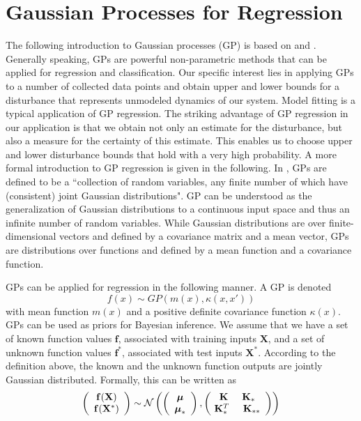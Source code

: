\documentclass[../main.tex]{subfiles}
\begin{document}
\section{Gaussian Processes for Regression}\label{sec:GP}
The following introduction to Gaussian processes (GP) is based on \cite{murphy2012machine} and \cite{rasmussen2006gaussian}. Generally speaking, GPs are powerful non-parametric methods that can be applied for regression and classification. Our specific interest lies in applying GPs to a number of collected data points and obtain upper and lower bounds for a disturbance that represents unmodeled dynamics of our system. Model fitting is a typical application of GP regression. The striking advantage of GP regression in our application is that we obtain not only an estimate for the disturbance, but also a measure for the certainty of this estimate. This enables us to choose upper and lower disturbance bounds that hold with a very high probability. A more formal introduction to GP regression is given in the following. In \cite{rasmussen2006gaussian}, GPs are defined to be a ``collection of random variables, any finite number of which have (consistent) joint Gaussian distributions". GP can be understood as the generalization of Gaussian distributions to a continuous input space and thus an infinite number of random variables. While Gaussian distributions are over finite-dimensional vectors and defined by a covariance matrix and a mean vector, GPs are distributions over functions and defined by a mean function and a covariance function.\par
GPs can be applied for regression in the following manner. A GP is denoted
\begin{equation}
    f(x) \sim GP(m(x),\kappa(x,x'))
\end{equation}
with mean function $m(x)$ and a positive definite covariance function $\kappa(x)$. GPs can be used as priors for Bayesian inference. We assume that we have a set of known function values $\mathbf{f}$, associated with training inputs $\mathbf{X}$, and a set of unknown function values $\mathbf{f^*}$, associated with test inputs $\mathbf{X^*}$. According to the definition above, the known and the unknown function outputs are jointly Gaussian distributed. Formally, this can be written as
\begin{equation}
    \left(
    \begin{array}{c}
      \mathbf{f(\mathbf{X})} \\\mathbf{f(\mathbf{X^*})}
    \end{array}
 \right) \sim \mathcal{N}
 \left(\left( 
  \begin{array}{c}
  \boldsymbol{\mu} \\ \boldsymbol{\mu}_* 
  \end{array}
  \right),
  \left(\!
  \begin{array}{c}
  \mathbf{K} \hspace{0.5cm} \mathbf{K}_* \\
  \mathbf{K}^T_* \hspace{0.5cm} \mathbf{K}_{**}  
  \end{array}
  \right)
  \right)
\end{equation}
\end{document}
